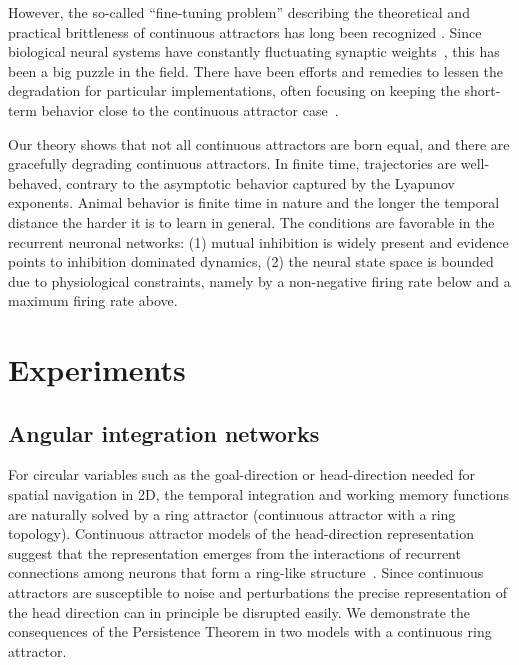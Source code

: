 \documentclass{article} %
\newcounter{ct}
\theoremstyle{definition}
\theoremstyle{remark}
\renewcommand{\cite}{\citep}
\begin{document}
However, the so-called ``fine-tuning problem'' describing the theoretical and practical brittleness of continuous attractors has long been recognized \citep{seung1998,Park2023a}.
Since biological neural systems have constantly fluctuating synaptic weights~\cite{shimizu2021}, this has been a big puzzle in the field.
There have been efforts and remedies to lessen the degradation for particular implementations, often focusing on keeping the short-term behavior close to the continuous attractor case~\cite{Lim2012,Lim2013,Boerlin2013,Koulakov2002,Renart2003,gu2022}.

Our theory shows that not all continuous attractors are born equal, and there are gracefully degrading continuous attractors.
In finite time, trajectories are well-behaved, contrary to the asymptotic behavior captured by the Lyapunov exponents.
Animal behavior is finite time in nature and the longer the temporal distance the harder it is to learn in general.
The conditions are favorable in the recurrent neuronal networks: (1) mutual inhibition is widely present and evidence points to inhibition dominated dynamics,
(2) the neural state space is bounded due to physiological constraints, namely by a non-negative firing rate below and a maximum firing rate above.


\section{Experiments}

\subsection{Angular integration networks}\label{sec:hd}
For circular variables such as the goal-direction or head-direction needed for spatial navigation in 2D, the temporal integration and working memory functions are naturally solved by a ring attractor (continuous attractor with a ring topology).
Continuous attractor models of the head-direction representation suggest that the representation emerges from the interactions of recurrent connections among neurons that form a ring-like structure~\citep{zhang1996,Noorman2022,ajabi2023}.
Since continuous attractors are susceptible to noise and perturbations the precise representation of the head direction can in principle be disrupted easily.
We demonstrate the consequences of the Persistence Theorem in two models with a continuous ring attractor.
\end{document}
